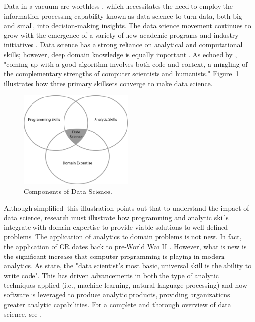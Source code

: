 \documentclass[twocolumn]{svjour3}       %
\begin{document}
Data in a vacuum are worthless \citep{gm15}, which necessitates the need to employ the information processing capability known as data science to turn data, both big and small, into decision-making insights. The data science movement continues to grow with the emergence of a variety of new academic programs and industry initiatives \citep{d15,ss15}. Data science has a strong reliance on analytical and computational skills; however, deep domain knowledge is equally important \citep{wf13}.  As echoed by \citet[p. 95]{smbdel15}, "coming up with a good algorithm involves both code and context, a mingling of the complementary strengths of computer scientists and humanists." Figure~\ref{fig:1} illustrates how three primary skillsets converge to make data science.

\begin{figure}[!htb]
  \includegraphics[width=0.5\textwidth]{venn-diagram.png}
  \caption{Components of Data Science.}
  \label{fig:1}
\end{figure}

Although simplified, this illustration points out that to understand the impact of data science, research must illustrate how programming and analytic skills integrate with domain expertise to provide viable solutions to well-defined problems. The application of analytics to domain problems is not new.  In fact, the application of OR dates back to pre-World War II \citep{l84}.  However, what is new is the significant increase that computer programming is playing in modern analytics.  As \citet[p. 74]{dp12} state, the "data scientist's most basic, universal skill is the ability to write code".  This has driven advancements in both the type of analytic techniques applied (i.e., machine learning, natural language processing) and how software is leveraged to produce analytic products, providing organizations greater analytic capabilities. For a complete and thorough overview of data science, see \citet{c17}.
\end{document}

